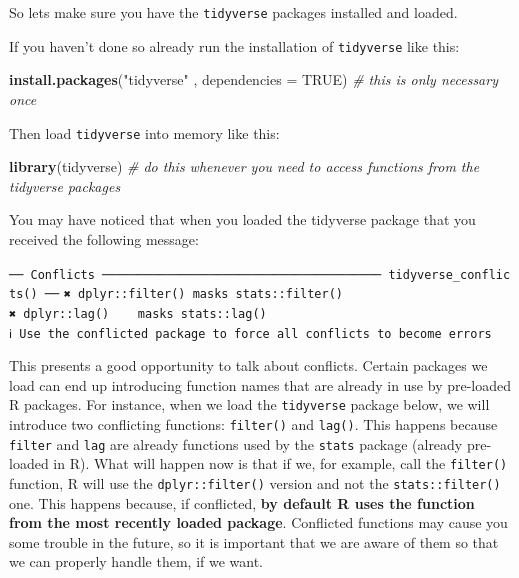 \documentclass[
]{book}
\newenvironment{Shaded}{\begin{snugshade}}{\end{snugshade}}
\newcommand{\AttributeTok}[1]{\textcolor[rgb]{0.13,0.29,0.53}{#1}}
\newcommand{\CommentTok}[1]{\textcolor[rgb]{0.56,0.35,0.01}{\textit{#1}}}
\newcommand{\ConstantTok}[1]{\textcolor[rgb]{0.56,0.35,0.01}{#1}}
\newcommand{\FunctionTok}[1]{\textcolor[rgb]{0.13,0.29,0.53}{\textbf{#1}}}
\newcommand{\NormalTok}[1]{#1}
\newcommand{\StringTok}[1]{\textcolor[rgb]{0.31,0.60,0.02}{#1}}
\begin{document}
So lets make sure you have the \texttt{tidyverse} packages installed and loaded.

If you haven't done so already run the installation of \texttt{tidyverse} like this:

\begin{Shaded}
\begin{Highlighting}[]
\FunctionTok{install.packages}\NormalTok{(}\StringTok{"tidyverse"}\NormalTok{ , }\AttributeTok{dependencies =} \ConstantTok{TRUE}\NormalTok{) }\CommentTok{\# this is only necessary once}
\end{Highlighting}
\end{Shaded}

Then load \texttt{tidyverse} into memory like this:

\begin{Shaded}
\begin{Highlighting}[]
\FunctionTok{library}\NormalTok{(tidyverse) }\CommentTok{\# do this whenever you need to access functions from the tidyverse packages }
\end{Highlighting}
\end{Shaded}

You may have noticed that when you loaded the tidyverse package that you received the following message:

\texttt{──\ Conflicts\ ───────────────────────────────────────\ tidyverse\_conflicts()\ ──}
\texttt{✖\ dplyr::filter()\ masks\ stats::filter()}
\texttt{✖\ dplyr::lag()\ \ \ \ masks\ stats::lag()}
\texttt{ℹ\ Use\ the\ conflicted\ package\ to\ force\ all\ conflicts\ to\ become\ errors}

This presents a good opportunity to talk about conflicts. Certain packages we load can end up introducing function names that are already in use by pre-loaded R packages. For instance, when we load the \texttt{tidyverse} package below, we will introduce two conflicting functions: \texttt{filter()} and \texttt{lag()}. This happens because \texttt{filter} and \texttt{lag} are already functions used by the \texttt{stats} package (already pre-loaded in R). What will happen now is that if we, for example, call the \texttt{filter()} function, R will use the \texttt{dplyr::filter()} version and not the \texttt{stats::filter()} one. This happens because, if conflicted, \textbf{by default R uses the function from the most recently loaded package}. Conflicted functions may cause you some trouble in the future, so it is important that we are aware of them so that we can properly handle them, if we want.
\end{document}
